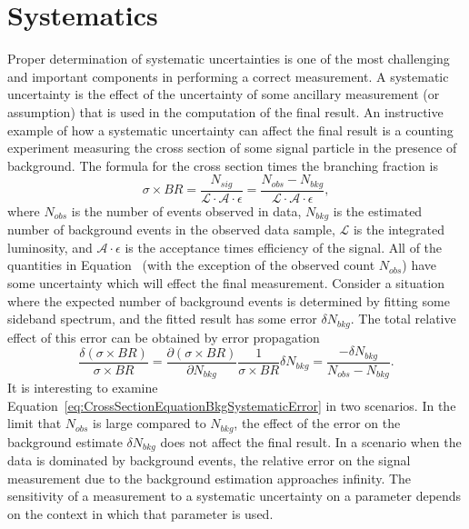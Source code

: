 \ifx\master\undefined\fi

\chapter{Systematics} \label{ch:systematics} Proper determination of systematic
uncertainties is one of the most challenging and important components in
performing a correct measurement.  A systematic uncertainty is the effect of the
uncertainty of some ancillary measurement (or assumption) that is used in the
computation of the final result.  An instructive example of how a systematic
uncertainty can affect the final result is a counting experiment measuring the cross
section of some signal particle in the presence of background.  The formula for
the cross section times the branching fraction is
\begin{equation}
  \sigma \times BR = \frac{N_{sig}}{\mathcal{L} \cdot \mathcal {A} \cdot
  \epsilon} = \frac{N_{obs}-N_{bkg}}{\mathcal{L} \cdot \mathcal {A} \cdot
  \epsilon}, \label{eq:CrossSectionEquation}
\end{equation}
where $N_{obs}$ is the number of events observed in data, $N_{bkg}$ is the
estimated number of background events in the observed data sample, $\mathcal{L}$
is the integrated luminosity, and $\mathcal{A} \cdot \epsilon$ is the acceptance
times efficiency of the signal.  All of the quantities in
Equation~\label{eq:CrossSectionEquation} (with the exception of the observed
count $N_{obs}$) have some uncertainty which will effect the final measurement.
Consider a situation where the expected number of background events is
determined by fitting some sideband spectrum, and the fitted result has some
error $\delta N_{bkg}$.  The total relative effect of this error can
be obtained by error propagation
\begin{equation}
  \frac{\delta (\sigma \times BR)}{\sigma \times BR} = \frac{\partial(\sigma
  \times BR)}{\partial N_{bkg}}  \frac{1}{\sigma \times BR} \delta N_{bkg} =
  \frac{-\delta N_{bkg}} {N_{obs}-N_{bkg}}.
  \label{eq:CrossSectionEquationBkgSystematicError}
\end{equation}
It is interesting to examine
Equation~\ref{eq:CrossSectionEquationBkgSystematicError} in two scenarios.  In
the limit that $N_{obs}$ is large compared to $N_{bkg}$, the effect of the error
on the background estimate $\delta N_{bkg}$ does not affect the final result.
In a scenario when the data is dominated by background events, the relative
error on the signal measurement due to the background estimation approaches
infinity.  The sensitivity of a measurement to a systematic uncertainty on a
parameter depends on the context in which that parameter is used.

